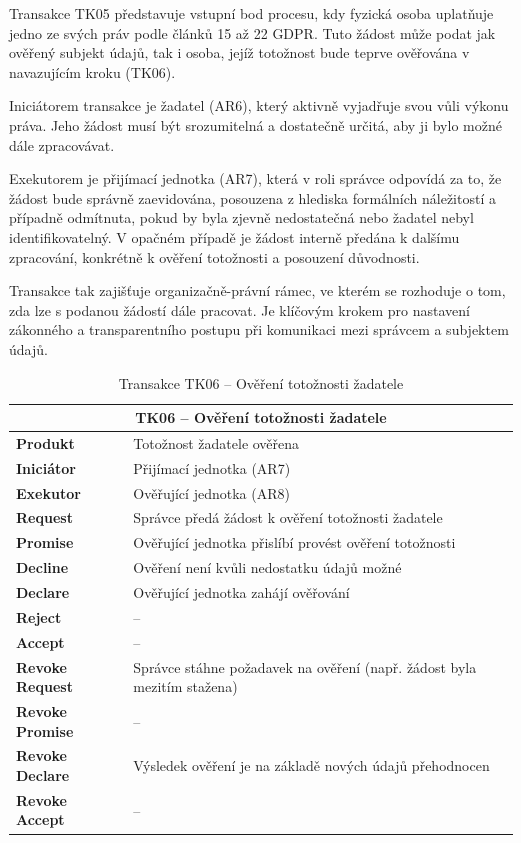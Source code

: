 \begin{itemize}
  Transakce TK05 představuje vstupní bod procesu, kdy fyzická osoba uplatňuje jedno ze svých práv podle článků 15 až 22 GDPR. Tuto žádost může podat jak ověřený subjekt údajů, tak i osoba, jejíž totožnost bude teprve ověřována v navazujícím kroku (TK06).

  Iniciátorem transakce je žadatel (AR6), který aktivně vyjadřuje svou vůli výkonu práva. Jeho žádost musí být srozumitelná a dostatečně určitá, aby ji bylo možné dále zpracovávat.

  Exekutorem je přijímací jednotka (AR7), která v roli správce odpovídá za to, že žádost bude správně zaevidována, posouzena z hlediska formálních náležitostí a případně odmítnuta, pokud by byla zjevně nedostatečná nebo žadatel nebyl identifikovatelný. V opačném případě je žádost interně předána k dalšímu zpracování, konkrétně k ověření totožnosti a posouzení důvodnosti.

  Transakce tak zajišťuje organizačně-právní rámec, ve kterém se rozhoduje o tom, zda lze s podanou žádostí dále pracovat. Je klíčovým krokem pro nastavení zákonného a transparentního postupu při komunikaci mezi správcem a subjektem údajů.

  \begin{table}[H]
    \centering
    \renewcommand{\arraystretch}{1.2}
    \begin{tabular}{|p{3.1cm}|p{9.9cm}|}
    \hline
    \multicolumn{2}{|c|}{\textbf{TK06 – Ověření totožnosti žadatele}} \\
    \hline
    \textbf{Produkt} & Totožnost žadatele ověřena \\
    \hline
    \textbf{Iniciátor} & Přijímací jednotka (AR7) \\
    \hline
    \textbf{Exekutor} & Ověřující jednotka (AR8) \\
    \hline
    \textbf{Request} & Správce předá žádost k ověření totožnosti žadatele \\
    \hline
    \textbf{Promise} & Ověřující jednotka přislíbí provést ověření totožnosti \\
    \hline
    \textbf{Decline} & Ověření není kvůli nedostatku údajů možné \\
    \hline
    \textbf{Declare} & Ověřující jednotka zahájí ověřování \\
    \hline
    \textbf{Reject} & – \\
    \hline
    \textbf{Accept} & – \\
    \hline
    \textbf{Revoke Request} & Správce stáhne požadavek na ověření (např. žádost byla mezitím stažena) \\
    \hline
    \textbf{Revoke Promise} & – \\
    \hline
    \textbf{Revoke Declare} & Výsledek ověření je na základě nových údajů přehodnocen \\
    \hline
    \textbf{Revoke Accept} & – \\
    \hline
    \end{tabular}
    \caption{Transakce TK06 – Ověření totožnosti žadatele}
  \end{table}


\end{itemize}
